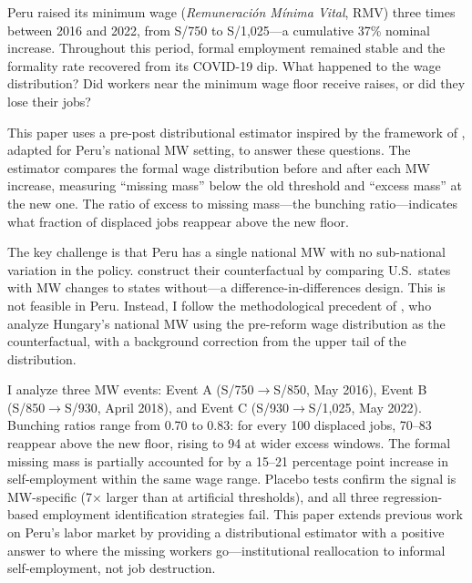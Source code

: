 \documentclass[12pt]{article}
\begin{document}
Peru raised its minimum wage (\textit{Remuneraci\'on M\'inima Vital}, RMV) three times between 2016 and 2022, from S/750 to S/1,025---a cumulative 37\% nominal increase. Throughout this period, formal employment remained stable and the formality rate recovered from its COVID-19 dip. What happened to the wage distribution? Did workers near the minimum wage floor receive raises, or did they lose their jobs?

This paper uses a pre-post distributional estimator inspired by the framework of \citet{cengiz2019}, adapted for Peru's national MW setting, to answer these questions. The estimator compares the formal wage distribution before and after each MW increase, measuring ``missing mass'' below the old threshold and ``excess mass'' at the new one. The ratio of excess to missing mass---the bunching ratio---indicates what fraction of displaced jobs reappear above the new floor.

The key challenge is that Peru has a single national MW with no sub-national variation in the policy. \citet{cengiz2019} construct their counterfactual by comparing U.S.\ states with MW changes to states without---a difference-in-differences design. This is not feasible in Peru. Instead, I follow the methodological precedent of \citet{harasztosi2016}, who analyze Hungary's national MW using the pre-reform wage distribution as the counterfactual, with a background correction from the upper tail of the distribution.

I analyze three MW events: Event A (S/750$\to$S/850, May 2016), Event B (S/850$\to$S/930, April 2018), and Event C (S/930$\to$S/1,025, May 2022). Bunching ratios range from 0.70 to 0.83: for every 100 displaced jobs, 70--83 reappear above the new floor, rising to 94 at wider excess windows. The formal missing mass is partially accounted for by a 15--21 percentage point increase in self-employment within the same wage range. Placebo tests confirm the signal is MW-specific (7$\times$ larger than at artificial thresholds), and all three regression-based employment identification strategies fail. This paper extends previous work on Peru's labor market \citep{jaramillo2004, cespedes2006, cespedes2014, jaramillo2012, chavez2024ethnic, chavez2023dv} by providing a distributional estimator with a positive answer to where the missing workers go---institutional reallocation to informal self-employment, not job destruction.
\end{document}

